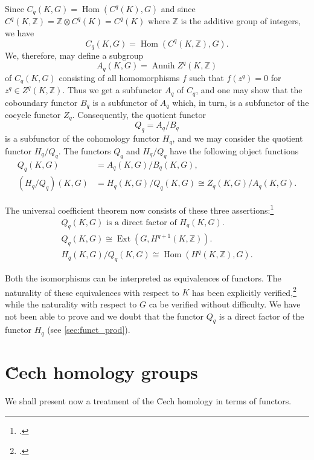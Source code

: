 \documentclass[11pt,a4paper]{report}
\DeclareMathOperator{\hm}{Hom}
\DeclareMathOperator{\an}{Annih}
\DeclareMathOperator{\ex}{Ext}
\begin{document}
Since $C_q(K,G)=\hm(C^q(K),G)$ and since $C^q(K,\mathbb{Z})= \mathbb{Z}\otimes C^q(K)=C^q(K)$ where 
$\mathbb{Z}$ is the additive group of integers, we have
\begin{equation*}
	C_q(K,G)=\hm(C^q(K,\mathbb{Z}),G).
\end{equation*}
We, therefore, may define a subgroup
\begin{equation*}
	A_q(K,G)=\an Z^q(K,\mathbb{Z})
\end{equation*}
of $C_q(K,G)$ consisting of all homomorphisms $f$ such that $f(z^q)=0$ for $z^q\in Z^q(K,\mathbb{Z})$.
Thus we get a subfunctor $A_q$ of $C_q$, and one may show that the coboundary functor $B_q$ is a subfunctor
of $A_q$ which, in turn, is a subfunctor of the cocycle functor $Z_q$. Consequently, the quotient functor
\begin{equation*}
	Q_q= A_q/B_q
\end{equation*}
is a subfunctor of the cohomology functor $H_q$, and we may consider the quotient functor $H_q/Q_q$.
The functors $Q_q$ and $H_q/Q_q$ have the following object functions
\begin{align*}
	Q_q(K,G) &= A_q(K,G)/B_q(K,G),\\
	(H_q/Q_q)(K,G) &= H_q(K,G)/Q_q(K,G)\cong Z_q(K,G)/A_q(K,G).
\end{align*}

The universal coefficient theorem now consists of these three assertions:\footcite[808]{eilenberg42}
\begin{gather}
	Q_q(K,G)\text{ is a direct factor of } H_q(K,G).\label{eq:uni-coeff1}\\
	Q_q(K,G)\cong\ex(G,H^{q+1}(K,\mathbb{Z})).\label{eq:uni-coeff2}\\
	H_q(K,G)/Q_q(K,G)\cong\hm(H^q(K,\mathbb{Z}),G).\label{eq:uni-coeff3}
\end{gather}

Both the isomorphisms  can be interpreted as equivalences of functors.
The naturality of these equivalences with respect to $K$ has been explicitly verified,\footcite[815]{eilenberg42}
while the naturality with respect to $G$ ca be verified without difficulty. We have not been able to prove and
we doubt that the functor $Q_q$ is a direct factor of the functor $H_q$ (see \cref{sec:funct_prod}).

\section{\u{C}ech homology groups}\label{sec:cech-hom}
We shall present now a treatment of the \u{C}ech homology in terms of functors.
\end{document}
